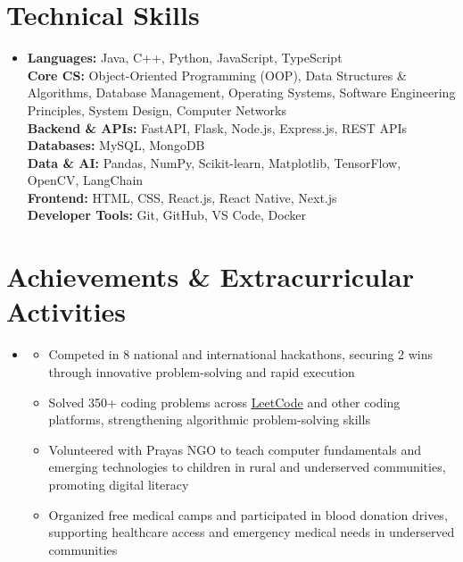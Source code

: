 \documentclass[letterpaper,11pt]{article}
\newcommand{\resumeItem}[1]{
    \item\small{#1}
}
\newcommand{\resumeSubHeadingListStart}{
    \begin{itemize}[
        leftmargin=0.15in,
        label={},
        topsep=0pt,
        partopsep=0pt,
        parsep=0pt,
        itemsep=2pt
    ]
}
\newcommand{\resumeSubHeadingListEnd}{
    \end{itemize}
}
\newcommand{\resumeItemListStart}{
    \begin{itemize}[
        leftmargin=0.18in,
        topsep=0pt,
        partopsep=0pt,
        parsep=0pt,
        itemsep=0pt
    ]
}
\newcommand{\resumeItemListEnd}{
    \end{itemize}
}
\begin{document}
\section{Technical Skills}

\resumeSubHeadingListStart
    \item
    \small{
        \textbf{Languages:} Java, C++, Python, JavaScript, TypeScript \\
        \textbf{Core CS:} Object-Oriented Programming (OOP), Data Structures \& Algorithms, Database Management, Operating Systems, Software Engineering Principles, System Design, Computer Networks \\
        \textbf{Backend \& APIs:} FastAPI, Flask, Node.js, Express.js, REST APIs \\
        \textbf{Databases:} MySQL, MongoDB \\
        \textbf{Data \& AI:} Pandas, NumPy, Scikit-learn, Matplotlib, TensorFlow, OpenCV, LangChain \\
        \textbf{Frontend:} HTML, CSS, React.js, React Native, Next.js \\
        \textbf{Developer Tools:} Git, GitHub, VS Code, Docker
    }
\resumeSubHeadingListEnd

\section{Achievements \& Extracurricular Activities}

\resumeSubHeadingListStart

    \item
    \resumeItemListStart
        \resumeItem{Competed in 8 national and international hackathons, securing 2 wins through innovative problem-solving and rapid execution}
        \resumeItem{Solved 350+ coding problems across \href{https://leetcode.com/u/saadziaatharkhan/}{\underline{LeetCode}} and other coding platforms, strengthening algorithmic problem-solving skills}
        \resumeItem{Volunteered with Prayas NGO to teach computer fundamentals and emerging technologies to children in rural and underserved communities, promoting digital literacy}
        \resumeItem{Organized free medical camps and participated in blood donation drives, supporting healthcare access and emergency medical needs in underserved communities}
    \resumeItemListEnd

\resumeSubHeadingListEnd


\end{document}
